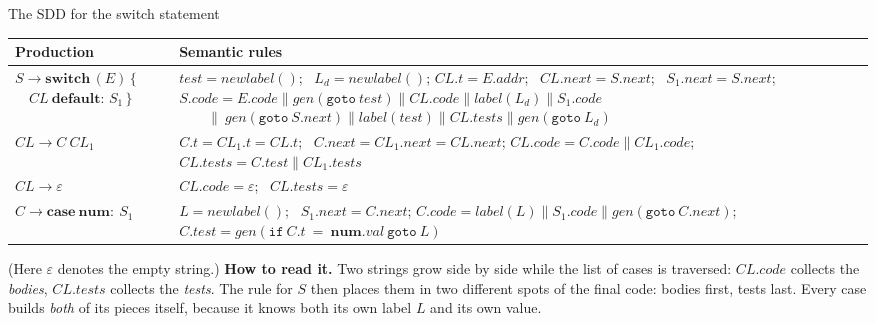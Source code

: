 \documentclass[11pt,a4paper]{article}
\newcommand{\cc}{\mathbin{\|}}
\newcommand{\at}[2]{\ensuremath{#1.\mathit{#2}}}
\newcommand{\tok}[1]{\ensuremath{\mathtt{#1}}}
\begin{document}
\begin{defbox}{The SDD for the switch statement}
\begin{center}
\small
\begin{tabular}{@{}p{4.1cm} p{9.9cm}@{}}
\toprule
\textbf{Production} & \textbf{Semantic rules} \\ \midrule
$S \to \mathbf{switch}\,(E)\,\{$\newline $\quad\mathit{CL}\ \mathbf{default}:\,S_1\,\}$ &
 $\mathit{test}=\mathit{newlabel}()$; \ $L_d=\mathit{newlabel}()$;\newline
 $\at{CL}{t}=\at{E}{addr}$; \ $\at{CL}{next}=\at{S}{next}$; \ $\at{S_1}{next}=\at{S}{next}$;\newline
 $\at{S}{code}=\at{E}{code}\cc\mathit{gen}(\tok{goto}\ \mathit{test})\cc\at{CL}{code}\cc\mathit{label}(L_d)\cc\at{S_1}{code}$\newline
 $\qquad\cc\ \mathit{gen}(\tok{goto}\ \at{S}{next})\cc\mathit{label}(\mathit{test})\cc\at{CL}{tests}\cc\mathit{gen}(\tok{goto}\ L_d)$ \\[6pt]
$\mathit{CL} \to C\ \mathit{CL}_1$ &
 $\at{C}{t}=\at{CL_1}{t}=\at{CL}{t}$; \ $\at{C}{next}=\at{CL_1}{next}=\at{CL}{next}$;\newline
 $\at{CL}{code}=\at{C}{code}\cc\at{CL_1}{code}$; \ $\at{CL}{tests}=\at{C}{test}\cc\at{CL_1}{tests}$ \\[6pt]
$\mathit{CL} \to \varepsilon$ & $\at{CL}{code}=\varepsilon$; \ $\at{CL}{tests}=\varepsilon$ \\[6pt]
$C \to \mathbf{case}\ \mathbf{num}:\ S_1$ &
 $L=\mathit{newlabel}()$; \ $\at{S_1}{next}=\at{C}{next}$;\newline
 $\at{C}{code}=\mathit{label}(L)\cc\at{S_1}{code}\cc\mathit{gen}(\tok{goto}\ \at{C}{next})$;\newline
 $\at{C}{test}=\mathit{gen}(\tok{if}\ \at{C}{t}\ \tok{=}\ \at{\mathbf{num}}{val}\ \tok{goto}\ L)$ \\ \bottomrule
\end{tabular}
\end{center}
(Here $\varepsilon$ denotes the empty string.) \textbf{How to read it.} Two strings grow side by side while the list of cases is traversed: \at{CL}{code} collects the \emph{bodies}, \at{CL}{tests} collects the \emph{tests}. The rule for $S$ then places them in two different spots of the final code: bodies first, tests last. Every case builds \emph{both} of its pieces itself, because it knows both its own label $L$ and its own value.
\end{defbox}
\end{document}
